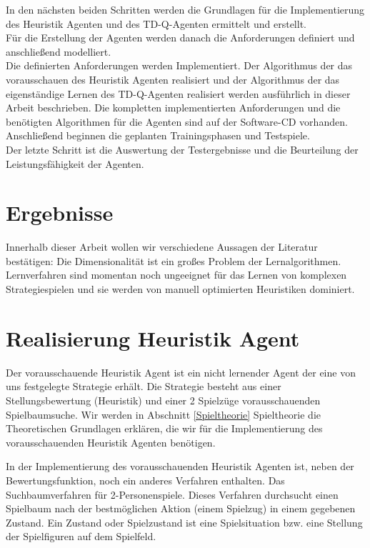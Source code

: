 In den nächsten beiden Schritten werden die Grundlagen für die Implementierung des Heuristik Agenten und des TD-Q-Agenten ermittelt und erstellt. \\

Für die Erstellung der Agenten werden danach die Anforderungen definiert und anschließend modelliert. \\

Die definierten Anforderungen werden Implementiert. Der Algorithmus der das vorausschauen des Heuristik Agenten realisiert und der Algorithmus der das eigenständige Lernen des TD-Q-Agenten realisiert werden ausführlich in dieser Arbeit beschrieben. Die kompletten implementierten Anforderungen und die benötigten Algorithmen für die Agenten sind auf der Software-CD vorhanden. \\

Anschließend beginnen die geplanten Trainingsphasen und Testspiele. \\

Der letzte Schritt ist die Auswertung der Testergebnisse und die Beurteilung der Leistungsfähigkeit der Agenten. \\

\section{Ergebnisse}

Innerhalb dieser Arbeit wollen wir verschiedene Aussagen der Literatur bestätigen: Die Dimensionalität ist ein großes Problem der Lernalgorithmen. Lernverfahren sind momentan noch ungeeignet für das Lernen von komplexen Strategiespielen und sie werden von manuell optimierten Heuristiken dominiert.





\section{Realisierung Heuristik Agent}
Der vorausschauende Heuristik Agent ist ein nicht lernender Agent der eine von uns festgelegte Strategie erhält. Die Strategie besteht aus einer Stellungsbewertung (Heuristik) und einer 2 Spielzüge vorausschauenden Spielbaumsuche. Wir werden in Abschnitt \ref{Spieltheorie} Spieltheorie die Theoretischen Grundlagen erklären, die wir für die Implementierung des vorausschauenden Heuristik Agenten benötigen.  


In der Implementierung des vorausschauenden Heuristik Agenten ist, neben der Bewertungsfunktion, noch ein anderes Verfahren enthalten. Das Suchbaumverfahren für 2-Personenspiele. Dieses Verfahren durchsucht einen Spielbaum nach der bestmöglichen Aktion (einem Spielzug) in einem gegebenen Zustand. Ein Zustand oder Spielzustand ist eine Spielsituation bzw. eine Stellung der Spielfiguren auf dem Spielfeld. \\

